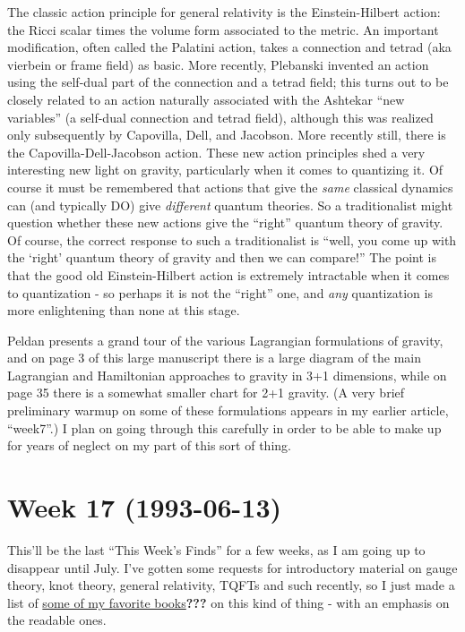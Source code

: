 \documentclass{article}
\begin{document}
The classic action principle for general relativity is the
Einstein-Hilbert action: the Ricci scalar times the volume form
associated to the metric. An important modification, often called the
Palatini action, takes a connection and tetrad (aka vierbein or frame
field) as basic. More recently, Plebanski invented an action using the
self-dual part of the connection and a tetrad field; this turns out to
be closely related to an action naturally associated with the Ashtekar
``new variables'' (a self-dual connection and tetrad field), although
this was realized only subsequently by Capovilla, Dell, and Jacobson.
More recently still, there is the Capovilla-Dell-Jacobson action. These
new action principles shed a very interesting new light on gravity,
particularly when it comes to quantizing it. Of course it must be
remembered that actions that give the \emph{same} classical dynamics can
(and typically DO) give \emph{different} quantum theories. So a
traditionalist might question whether these new actions give the
``right'' quantum theory of gravity. Of course, the correct response to
such a traditionalist is ``well, you come up with the `right' quantum
theory of gravity and then we can compare!'' The point is that the good
old Einstein-Hilbert action is extremely intractable when it comes to
quantization - so perhaps it is not the ``right'' one, and \emph{any}
quantization is more enlightening than none at this stage.

Peldan presents a grand tour of the various Lagrangian formulations of
gravity, and on page 3 of this large manuscript there is a large diagram
of the main Lagrangian and Hamiltonian approaches to gravity in 3+1
dimensions, while on page 35 there is a somewhat smaller chart for 2+1
gravity. (A very brief preliminary warmup on some of these formulations
appears in my earlier article, ``week7''.) I plan on going through this
carefully in order to be able to make up for years of neglect on my part
of this sort of thing.
\hypertarget{week-17-1993-06-13}{%
\section{Week 17 (1993-06-13)}\label{week-17-1993-06-13}}

This'll be the last ``This Week's Finds'' for a few weeks, as I am going
up to disappear until July. I've gotten some requests for introductory
material on gauge theory, knot theory, general relativity, TQFTs and
such recently, so I just made a list of \href{books.html}{some of my
favorite books}\textbf{???} on this kind of thing - with an emphasis on
the readable ones.
\end{document}
